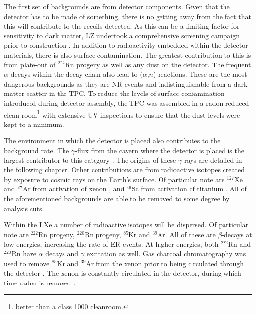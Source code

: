 \par
The first set of backgrounds are from detector components.
Given that the detector has to be made of something, there is no getting away from the fact that this will contribute to the recoils detected.
As this can be a limiting factor for sensitivity to dark matter, LZ undertook a comprehensive screening campaign prior to construction \cite{LZ_assay_ref}.
In addition to radioactivity embedded within the detector materials, there is also surface contamination.
The greatest contribution to this is from plate-out of ${}^{222}$Rn progeny as well as any dust on the detector.
The frequent $\alpha$-decays within the decay chain also lead to ($\alpha$,$n$) reactions.
These are the most dangerous backgrounds as they are NR events and indistinguishable from a dark matter scatter in the TPC.
To reduce the levels of surface contamination introduced during detector assembly, the TPC was assembled in a radon-reduced clean room\footnote{better than a class 1000 cleanroom.} with extensive UV inspections to ensure that the dust levels were kept to a minimum.

\par
The environment in which the detector is placed also contributes to the background rate.
The $\gamma$-flux from the cavern where the detector is placed is the largest contributor to this category \cite{LZ_Gamma_Ray_Background_ref}.
The origins of these $\gamma$-rays are detailed in the following chapter.
Other contributions are from radioactive isotopes created by exposure to cosmic rays on the Earth's surface.
Of particular note are $^{127}$Xe and ${}^{37}$Ar from activation of xenon \cite{lux_xenon_activation_ref,lz_argon37_ref}, and $^{46}$Sc from activation of titanium \cite{LZ_TechnicalDesignReview_ref}.
All of the aforementioned backgrounds are able to be removed to some degree by analysis cuts.

\par
Within the LXe a number of radioactive isotopes will be dispersed.
Of particular note are $^{222}$Rn progeny, $^{220}$Rn progeny, $^{85}$Kr and $^{39}$Ar.
All of these are $\beta$-decays at low energies, increasing the rate of ER events.
At higher energies, both $^{222}$Rn and $^{220}$Rn have $\alpha$ decays and $\gamma$ excitation as well.
Gas charcoal chromatography was used to remove $^{85}$Kr and $^{39}$Ar from the xenon prior to being circulated through the detector \cite{xenon_prufication_chromatography_ref}.
The xenon is constantly circulated in the detector, during which time radon is removed \cite{marisarthurs_thesis_ref}.

